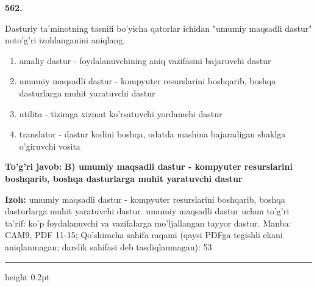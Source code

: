 \documentclass[10pt,a4paper]{article}
\begin{document}
{\bfseries\sffamily\color{ink} 562.}
\par
Dasturiy ta'minotning tasnifi bo'yicha qatorlar ichidan "umumiy maqsadli dastur" noto'g'ri izohlanganini aniqlang.
\begin{enumerate}[label=\Alph*),leftmargin=9mm]
\item amaliy dastur - foydalanuvchining aniq vazifasini bajaruvchi dastur
\item umumiy maqsadli dastur - kompyuter resurslarini boshqarib, boshqa dasturlarga muhit yaratuvchi dastur
\item utilita - tizimga xizmat ko'rsatuvchi yordamchi dastur
\item translator - dastur kodini boshqa, odatda mashina bajaradigan shaklga o'giruvchi vosita
\end{enumerate}
\begin{tcolorbox}[enhanced,breakable,colback=teal!4,colframe=teal!60!black,boxrule=0.45pt,arc=1.2mm,left=2.7mm,right=2.7mm,top=1.8mm,bottom=1.8mm,before skip=2mm,after skip=2mm]
{\bfseries\sffamily\color{teal}To'g'ri javob:} \textbf{B) umumiy maqsadli dastur - kompyuter resurslarini boshqarib, boshqa dasturlarga muhit yaratuvchi dastur}
\par\smallskip
{\bfseries Izoh:} umumiy maqsadli dastur - kompyuter resurslarini boshqarib, boshqa dasturlarga muhit yaratuvchi dastur. umumiy maqsadli dastur uchun to'g'ri ta'rif: ko'p foydalanuvchi va vazifalarga mo'ljallangan tayyor dastur. Manba: CAM9, PDF 11-15; Qo'shimcha sahifa raqami (qaysi PDFga tegishli ekani aniqlanmagan; darslik sahifasi deb tasdiqlanmagan): 53
\end{tcolorbox}
\vspace{2mm}\hrule height 0.2pt\vspace{3mm}
\end{document}
